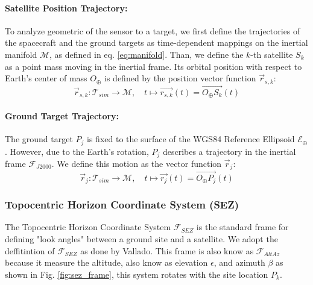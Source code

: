 \begin{table}[ht]
{\begin{itemize}
\paragraph{Satellite Position Trajectory:}
To analyze geometric of the sensor to a target, we first define the trajectories of the spacecraft and the ground targets as time-dependent mappings on the inertial manifold $\mathcal{M}$, as defined in eq. \ref{eq:manifold}. Than, we define the $k$-th satellite $S_k$ as a point mass moving in the inertial frame. Its orbital position with respect to Earth's center of mass $O_{\oplus}$ is defined by the position vector function $\vec{r}_{s,k}$:
\begin{equation}
    \vec{r}_{s,k} : \mathcal{T}_{sim} \to \mathcal{M}, \quad t \mapsto \overrightarrow{r_{s,k}}(t) = \overrightarrow{O_{\oplus}S_{k}}(t)
\end{equation}
\paragraph{Ground Target Trajectory:}
The ground target $P_j$ is fixed to the surface of the WGS84 Reference Ellipsoid $\mathcal{E}_\oplus$. However, due to the Earth's rotation, $P_j$ describes a trajectory in the inertial frame $\mathcal{F}_{J2000}$. We define this motion as the vector function $\vec{r}_j$:
\begin{equation}
    \vec{r}_{j} : \mathcal{T}_{sim} \to \mathcal{M}, \quad t \mapsto \overrightarrow{r_j}(t) = \overrightarrow{O_{\oplus}P_{j}}(t)
\end{equation}
\subsubsection{Topocentric Horizon Coordinate System (SEZ)}
The Topocentric Horizon Coordinate System $\mathcal{F}_{SEZ}$ is the standard frame for defining "look angles" between a ground site and a satellite. We adopt the deffitintion of $\mathcal{F}_{SEZ}$ as done by Vallado\cite{mcclain2001fundamentals}. This frame is also know as $\mathcal{F}_{AltAz}$ because it measure the altitude, also know as elevation $\epsilon$,  and azimuth $\beta$ as shown in Fig. \ref{fig:sez_frame}, this system rotates with the site location $P_{k}$.


\end{itemize}}
\end{table}

